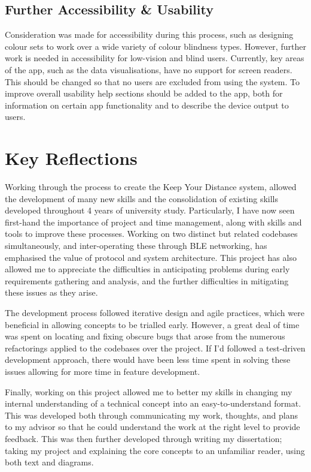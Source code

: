 \documentclass{l4proj}
\begin{document}
\subsection{Further Accessibility \& Usability}

Consideration was made for accessibility during this process, such as designing colour sets to work over a wide variety of colour blindness types. However, further work is needed in accessibility for low-vision and blind users. Currently, key areas of the app, such as the data visualisations, have no support for screen readers. This should be changed so that no users are excluded from using the system. To improve overall usability help sections should be added to the app, both for information on certain app functionality and to describe the device output to users.

\section{Key Reflections}

Working through the process to create the Keep Your Distance system, allowed the development of many new skills and the consolidation of existing skills developed throughout 4 years of university study. Particularly, I have now seen first-hand the importance of project and time management, along with skills and tools to improve these processes. Working on two distinct but related codebases simultaneously, and inter-operating these through BLE networking, has emphasised the value of protocol and system architecture. This project has also allowed me to appreciate the difficulties in anticipating problems during early requirements gathering and analysis, and the further difficulties in mitigating these issues as they arise.

The development process followed iterative design and agile practices, which were beneficial in allowing concepts to be trialled early. However, a great deal of time was spent on locating and fixing obscure bugs that arose from the numerous refactorings applied to the codebases over the project. If I'd followed a test-driven development approach, there would have been less time spent in solving these issues allowing for more time in feature development.

Finally, working on this project allowed me to better my skills in changing my internal understanding of a technical concept into an easy-to-understand format. This was developed both through communicating my work, thoughts, and plans to my advisor so that he could understand the work at the right level to provide feedback. This was then further developed through writing my dissertation; taking my project and explaining the core concepts to an unfamiliar reader, using both text and diagrams.
\end{document}
